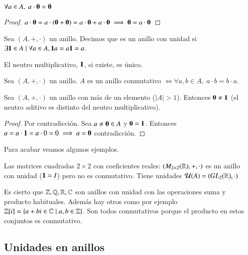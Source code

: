 \begin{pro}
	$\forall a \in A,\ a\cdot \mathbf{0} = \mathbf{0}$
\end{pro}

\begin{proof}
	$a \cdot \mathbf{0} = a \cdot(\mathbf{0} + \mathbf{0}) = a\cdot \mathbf{0} + a\cdot \mathbf{0} \implies \mathbf{0} = a\cdot \mathbf{0}$
\end{proof}

\begin{dfn}
	Sea $(A, +, \cdot)$ un anillo. Decimos que es un anillo con unidad si $\exists \mathbf{1} \in A \mid \forall a \in A, \mathbf{1} a = a \mathbf{1} = a$.
\end{dfn}

\begin{pro}
	El neutro multiplicativo, $\mathbf{1}$, si existe, es único.
\end{pro}

\begin{dfn}
	Sea $(A, +, \cdot)$ un anillo. $A$ es un anillo conmutativo $\iff \forall a, b \in A,\ a\cdot b = b \cdot a$.
\end{dfn}

\begin{pro}
	Sea $(A, +, \cdot)$ un anillo con más de un elemento ($|A| > 1$). Entonces $\mathbf{0} \neq \mathbf{1}$ (el neutro aditivo es distinto del neutro multiplicativo).
\end{pro}

\begin{proof}
	Por contradicción. Sea $a \neq \mathbf{0} \in A$ y $\mathbf{0} = \mathbf{1}$. Entonces $a = a\cdot \mathbf{1} = a\cdot 0 = 0 \implies a = \mathbf{0}$ contradicción.
\end{proof}

Para acabar veamos algunos ejemplos.

\begin{ej}
	Las matrices cuadradas $2\times 2$ con coeficientes reales: $(M_{2\times 2}(\mathbb{R}), +, \cdot)$ es un anillo con unidad ($\mathbf{1} = I$) pero no es conmutativo. Tiene unidades $\mathcal{U}(A) = (GL_2(\mathbb{R}), \cdot)$
\end{ej}

\begin{ej}
	Es cierto que $\mathbb{Z}, \mathbb{Q}, \mathbb{R}, \mathbb{C}$ son anillos con unidad con las operaciones suma y producto habituales. Además hay otros como por ejemplo $\mathbb{Z}[i] = \{a+bi \in \mathbb{C} \mid a,b \in \mathbb{Z}\}$. Son todos conmutativos porque el producto en estos conjuntos es conmutativo.
\end{ej}


\subsection{Unidades en anillos}


